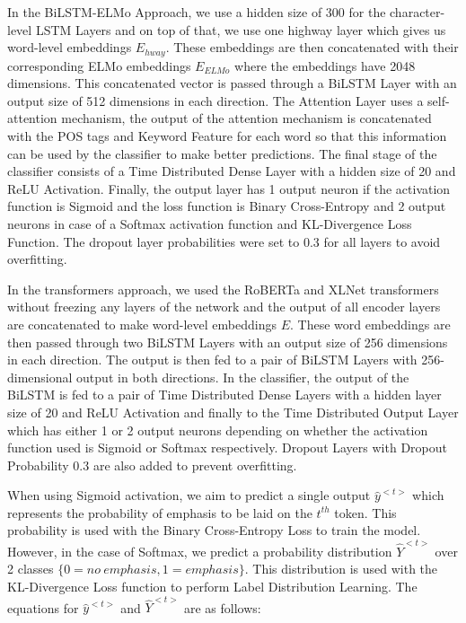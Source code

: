 \documentclass[letterpaper]{article}
\begin{document}
In the BiLSTM-ELMo Approach, we use a hidden size of 300 for the character-level LSTM Layers and on top of that, we use one highway layer which gives us word-level embeddings $E_{hway}$. These embeddings are then concatenated with their corresponding ELMo embeddings $E_{ELMo}$ where the embeddings have 2048 dimensions. This concatenated vector is passed through a BiLSTM Layer with an output size of 512 dimensions in each direction. The Attention Layer uses a self-attention mechanism, the output of the attention mechanism is concatenated with the POS tags and Keyword Feature for each word so that this information can be used by the classifier to make better predictions. The final stage of the classifier consists of a Time Distributed Dense Layer with a hidden size of 20 and ReLU Activation. Finally, the output layer has 1 output neuron if the activation function is Sigmoid and the loss function is Binary Cross-Entropy and 2 output neurons in case of a Softmax activation function and KL-Divergence Loss Function. The dropout layer probabilities were set to 0.3 for all layers to avoid overfitting.

In the transformers approach, we used the RoBERTa and XLNet transformers without freezing any layers of the network and the output of all encoder layers are concatenated to make word-level embeddings $E$. These word embeddings are then passed through two BiLSTM Layers with an output size of 256 dimensions in each direction. The output is then fed to a pair of BiLSTM Layers with 256-dimensional output in both directions. In the classifier, the output of the BiLSTM is fed to a pair of Time Distributed Dense Layers with a hidden layer size of 20 and ReLU Activation and finally to the Time Distributed Output Layer which has either 1 or 2 output neurons depending on whether the activation function used is Sigmoid or Softmax respectively. Dropout Layers with Dropout Probability 0.3 are also added to prevent overfitting.

When using Sigmoid activation, we aim to predict a single output $\hat{y}^{<t>}$ which represents the probability of emphasis to be laid on the $t^{th}$ token. This probability is used with the Binary Cross-Entropy Loss to train the model. However, in the case of Softmax, we predict a probability distribution $\hat{Y}^{<t>}$ over 2 classes $\{0 = no\:emphasis, 1 = emphasis\}$. This distribution is used with the KL-Divergence Loss function to perform Label Distribution Learning. The equations for $\hat{y}^{<t>}$ and $\hat{Y}^{<t>}$ are as follows:
\end{document}
